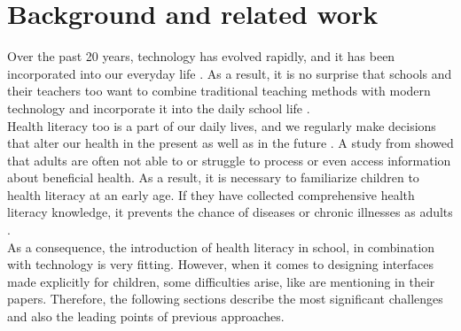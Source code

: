 \section{Background and related work}
\label{section:RelatedWork}
Over the past 20 years, technology has evolved rapidly, and it has been incorporated into our everyday life \autocite{sharmin2012effect, walker2000screen}. As a result, it is no surprise that schools and their teachers too want to combine traditional teaching methods with modern technology and incorporate it into the daily school life \autocite{lozano2016dedigitalizing}.\\
Health literacy too is a part of our daily lives, and we regularly make decisions that alter our health in the present as well as in the future \autocite{lawrence2001schools}. A study from \textcite{jordan2015gesundheitskompetenz} showed that adults are often not able to or struggle to process or even access information about beneficial health. As a result, it is necessary to familiarize children to health literacy at an early age. If they have collected comprehensive health literacy knowledge, it prevents the chance of diseases or chronic illnesses as adults \autocite{velardo2017emphasizing}.\\
As a consequence, the introduction of health literacy in school, in combination with technology is very fitting.
However, when it comes to designing interfaces made explicitly for children, some difficulties arise, like \textcite{boyd2015evaluating, gan2015enhancing} are mentioning in their papers. Therefore, the following sections describe the most significant challenges and also the leading points of previous approaches.

